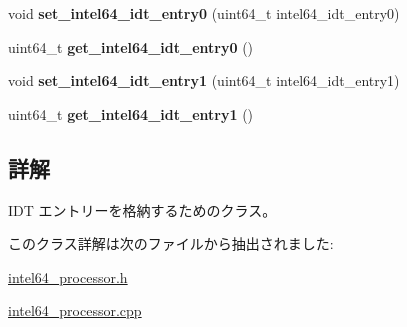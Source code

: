 \begin{DoxyCompactItemize}
\item 
\hypertarget{classintel64__idt__entry_ad8a58e31eb3fc61a76fa157d825c2483}{}void {\bfseries set\+\_\+intel64\+\_\+idt\+\_\+entry0} (uint64\+\_\+t intel64\+\_\+idt\+\_\+entry0)\label{classintel64__idt__entry_ad8a58e31eb3fc61a76fa157d825c2483}

\item 
\hypertarget{classintel64__idt__entry_abe93238c4630d4a5d55e9bd1333129eb}{}uint64\+\_\+t {\bfseries get\+\_\+intel64\+\_\+idt\+\_\+entry0} ()\label{classintel64__idt__entry_abe93238c4630d4a5d55e9bd1333129eb}

\item 
\hypertarget{classintel64__idt__entry_adebe9a174fc5722859ed508cd8e48beb}{}void {\bfseries set\+\_\+intel64\+\_\+idt\+\_\+entry1} (uint64\+\_\+t intel64\+\_\+idt\+\_\+entry1)\label{classintel64__idt__entry_adebe9a174fc5722859ed508cd8e48beb}

\item 
\hypertarget{classintel64__idt__entry_a8425e14356e2c24c047d0250cb8ac237}{}uint64\+\_\+t {\bfseries get\+\_\+intel64\+\_\+idt\+\_\+entry1} ()\label{classintel64__idt__entry_a8425e14356e2c24c047d0250cb8ac237}

\end{DoxyCompactItemize}


\subsection{詳解}
I\+D\+T エントリーを格納するためのクラス。 

このクラス詳解は次のファイルから抽出されました\+:\begin{DoxyCompactItemize}
\item 
\hyperlink{intel64__processor_8h}{intel64\+\_\+processor.\+h}\item 
\hyperlink{intel64__processor_8cpp}{intel64\+\_\+processor.\+cpp}\end{DoxyCompactItemize}
